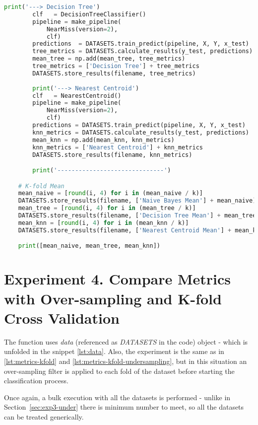 \begin{lstlisting}[language=Python, caption={Calculate Metrics from Confusion 
Matrix to compare in-fold results after applying under-sampling filter}, 
label={lst:metrics-kfold-undersampling}]
        print('---> Decision Tree')
        clf   = DecisionTreeClassifier()
        pipeline = make_pipeline(
            NearMiss(version=2),
            clf)
        predictions  = DATASETS.train_predict(pipeline, X, Y, x_test)
        tree_metrics = DATASETS.calculate_results(y_test, predictions)
        mean_tree = np.add(mean_tree, tree_metrics)
        tree_metrics = ['Decision Tree'] + tree_metrics
        DATASETS.store_results(filename, tree_metrics)
        
        print('---> Nearest Centroid')
        clf   = NearestCentroid()
        pipeline = make_pipeline(
            NearMiss(version=2),
            clf)
        predictions = DATASETS.train_predict(pipeline, X, Y, x_test)
        knn_metrics = DATASETS.calculate_results(y_test, predictions)
        mean_knn = np.add(mean_knn, knn_metrics)
        knn_metrics = ['Nearest Centroid'] + knn_metrics
        DATASETS.store_results(filename, knn_metrics)

        print('------------------------------')

    # K-fold Mean
    mean_naive = [round(i, 4) for i in (mean_naive / k)]
    DATASETS.store_results(filename, ['Naive Bayes Mean'] + mean_naive)
    mean_tree = [round(i, 4) for i in (mean_tree / k)]
    DATASETS.store_results(filename, ['Decision Tree Mean'] + mean_tree)
    mean_knn = [round(i, 4) for i in (mean_knn / k)]
    DATASETS.store_results(filename, ['Nearest Centroid Mean'] + mean_knn)

    print([mean_naive, mean_tree, mean_knn])
\end{lstlisting}

\section{Experiment 4. Compare Metrics with Over-sampling and K-fold Cross 
Validation}

The function uses \textit{data} (referenced as \textit{DATASETS} in the code) 
object - which is unfolded in the snippet \ref{lst:data}. Also, the experiment 
is the same as in \ref{lst:metrics-kfold} and 
\ref{lst:metrics-kfold-undersampling}, but in this situation an over-sampling 
filter is applied to each fold of the dataset before starting the classification
process.

Once again, a bulk execution with all the datasets is performed - unlike in 
Section~\ref{sec:exp3-under} there is minimum number to meet, so all the 
datasets can be treated generically.

